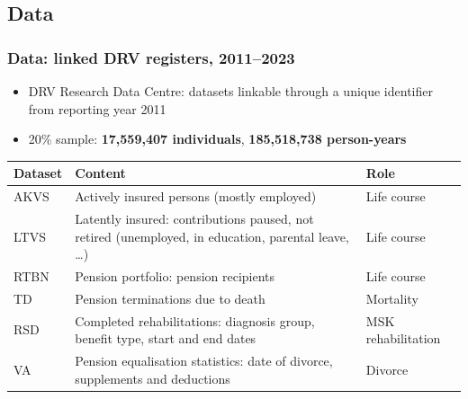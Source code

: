\documentclass[t,20pt]{beamer}
\newcommand{\hl}[1]{\textcolor{BiBViolett}{\textbf{#1}}}           %
\begin{document}
\subsection{Data}
\begin{bibframe}
  \frametitle{Data: linked DRV registers, 2011--2023}
  \begin{itemize}
    \item DRV Research Data Centre: datasets linkable through a unique identifier from reporting year 2011
    \item 20\% sample: \hl{17,559,407 individuals}, \hl{185,518,738 person-years}
  \end{itemize}
  \vspace{0.2cm}
  {%
  \begin{tabularx}{\linewidth}{@{}l Y l@{}}
    \toprule
    Dataset & Content & Role \\
    \midrule
    AKVS & Actively insured persons (mostly employed) & Life course \\
    LTVS & Latently insured: contributions paused, not retired (unemployed, in education, parental leave, \dots) & Life course \\
    RTBN & Pension portfolio: pension recipients & Life course \\
    \midrule
    TD & Pension terminations due to death & Mortality \\
    RSD & Completed rehabilitations: diagnosis group, benefit type, start and end dates & MSK rehabilitation \\
    VA & Pension equalisation statistics: date of divorce, supplements and deductions & Divorce \\
    \bottomrule
  \end{tabularx}
  }
\end{bibframe}
\end{document}
